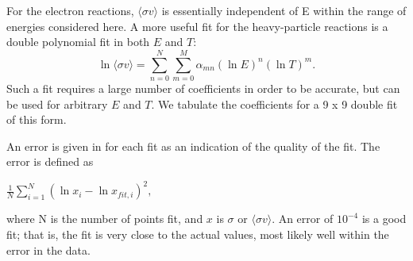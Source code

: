 \documentclass[12pt,dvipdfmx]{article}
\begin{document}
For the electron reactions, $\langle\sigma v\rangle$ is essentially independent of E within the range of energies considered
here. A more useful fit for the heavy-particle reactions is a double polynomial fit in both $E$ and $T$:\\
\begin{equation}\label{3}
      \ln \langle\sigma v\rangle = \sum_{n=0}^N\sum_{m=0}^M \alpha_{mn}(\ln E)^n(\ln T)^m.
\end{equation}
Such a fit requires a large number of coefficients in order to be accurate, but can be used for arbitrary
$E$ and $T$. We tabulate the coefficients for a 9 x 9 double fit of this form.

An error is given in \cite{kn:Janev} for each fit as an indication of the quality of the fit. The error is defined as

      $\frac{1}{N} \sum_{i=1}^N (\ln x_i - \ln x_{fit,i})^2,$

where N is the number of points fit, and $x$ is $\sigma$  or $\langle\sigma v\rangle$. An error of $10^{-4}$ is a good fit;
that is, the fit is very close to the actual values, most likely well within the error in the data.
\end{document}
